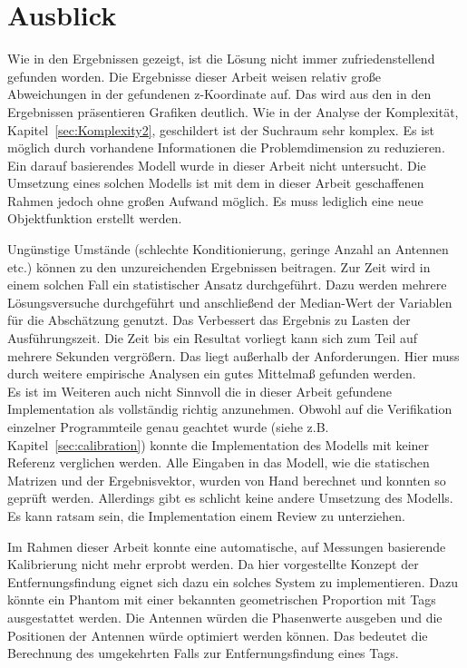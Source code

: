 %
\section{Ausblick}
\label{sec:Calibration_Optimaztion}
%
Wie in den Ergebnissen gezeigt, ist die Lösung nicht immer zufriedenstellend gefunden worden. Die Ergebnisse dieser Arbeit weisen relativ große Abweichungen in der gefundenen z-Koordinate auf. Das wird aus den in den Ergebnissen präsentieren Grafiken deutlich. Wie in der Analyse der Komplexität, Kapitel~\ref{sec:Komplexity2}, geschildert ist der Suchraum sehr komplex. Es ist möglich durch vorhandene Informationen die Problemdimension zu reduzieren. Ein darauf basierendes Modell wurde in dieser Arbeit nicht untersucht. Die Umsetzung eines solchen Modells ist mit dem in dieser Arbeit geschaffenen Rahmen jedoch ohne großen Aufwand möglich. Es muss lediglich eine neue Objektfunktion erstellt werden.

Ungünstige Umstände (schlechte Konditionierung, geringe Anzahl an Antennen etc.) können zu den unzureichenden Ergebnissen beitragen. Zur Zeit wird in einem solchen Fall ein statistischer Ansatz durchgeführt. Dazu werden mehrere Lösungsversuche durchgeführt und anschließend der Median-Wert der Variablen für die Abschätzung genutzt. Das Verbessert das Ergebnis zu Lasten der Ausführungszeit. Die Zeit bis ein Resultat vorliegt kann sich zum Teil auf mehrere Sekunden vergrößern. Das liegt außerhalb der Anforderungen. Hier muss durch weitere empirische Analysen ein gutes Mittelmaß gefunden werden.\\
%

Es ist im Weiteren auch nicht Sinnvoll die in dieser Arbeit gefundene Implementation als vollständig richtig anzunehmen. Obwohl auf die Verifikation einzelner Programmteile genau geachtet wurde (siehe z.B. Kapitel~\ref{sec:calibration}) konnte die Implementation des Modells mit keiner Referenz verglichen werden. Alle Eingaben in das Modell, wie die statischen Matrizen und der Ergebnisvektor, wurden von Hand berechnet und konnten so geprüft werden. Allerdings gibt es schlicht keine andere Umsetzung des Modells. Es kann ratsam sein, die Implementation einem Review zu unterziehen.
%

Im Rahmen dieser Arbeit konnte eine automatische, auf Messungen basierende Kalibrierung nicht mehr erprobt werden. Da hier vorgestellte Konzept der Entfernungsfindung eignet sich dazu ein solches System zu implementieren. Dazu könnte ein Phantom mit einer bekannten geometrischen Proportion mit Tags ausgestattet werden. Die Antennen würden die Phasenwerte ausgeben und die Positionen der Antennen würde optimiert werden können. Das bedeutet die Berechnung des umgekehrten Falls zur Entfernungsfindung eines Tags.\\
%

